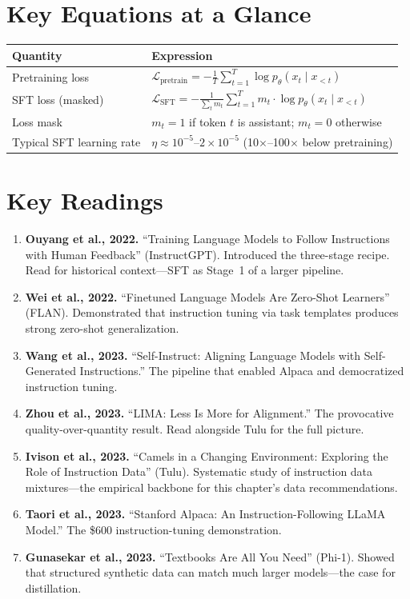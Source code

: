 \section*{Key Equations at a Glance}

\begin{center}
\begin{tabularx}{\textwidth}{@{}p{5cm}X@{}}
\toprule
\textbf{Quantity} & \textbf{Expression} \\
\midrule
Pretraining loss & $\mathcal{L}_{\text{pretrain}} = -\frac{1}{T}\sum_{t=1}^{T} \log p_\theta(x_t \mid x_{<t})$ \\[4pt]
SFT loss (masked) & $\mathcal{L}_{\text{SFT}} = -\frac{1}{\sum_t m_t}\sum_{t=1}^{T} m_t \cdot \log p_\theta(x_t \mid x_{<t})$ \\[4pt]
Loss mask & $m_t = 1$ if token $t$ is assistant; $m_t = 0$ otherwise \\[4pt]
Typical SFT learning rate & $\eta \approx 10^{-5}$--$2 \times 10^{-5}$ (10$\times$--100$\times$ below pretraining) \\
\bottomrule
\end{tabularx}
\end{center}


\section*{Key Readings}

\begin{enumerate}[nosep]
  \item \textbf{Ouyang et al., 2022.} ``Training Language Models to Follow Instructions with Human Feedback'' (InstructGPT). Introduced the three-stage recipe. Read for historical context---SFT as Stage~1 of a larger pipeline.
  \item \textbf{Wei et al., 2022.} ``Finetuned Language Models Are Zero-Shot Learners'' (FLAN). Demonstrated that instruction tuning via task templates produces strong zero-shot generalization.
  \item \textbf{Wang et al., 2023.} ``Self-Instruct: Aligning Language Models with Self-Generated Instructions.'' The pipeline that enabled Alpaca and democratized instruction tuning.
  \item \textbf{Zhou et al., 2023.} ``LIMA: Less Is More for Alignment.'' The provocative quality-over-quantity result. Read alongside Tulu for the full picture.
  \item \textbf{Ivison et al., 2023.} ``Camels in a Changing Environment: Exploring the Role of Instruction Data'' (Tulu). Systematic study of instruction data mixtures---the empirical backbone for this chapter's data recommendations.
  \item \textbf{Taori et al., 2023.} ``Stanford Alpaca: An Instruction-Following LLaMA Model.'' The \$600 instruction-tuning demonstration.
  \item \textbf{Gunasekar et al., 2023.} ``Textbooks Are All You Need'' (Phi-1). Showed that structured synthetic data can match much larger models---the case for distillation.
\end{enumerate}

\flushbottom
